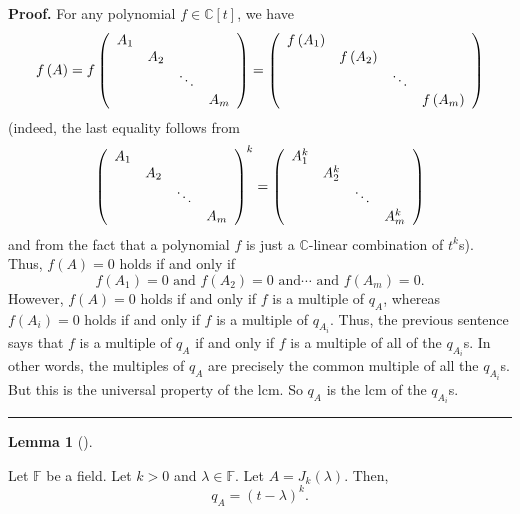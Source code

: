 \documentclass[numbers=enddot,12pt,final,onecolumn,notitlepage]{scrartcl}%
\numberwithin{exer}{subsection}
\theoremstyle{definition}
\newtheorem{lem}[theo]{Lemma}
\newenvironment{lemma}[1][]
{\begin{lem}[#1]\begin{leftbar}}
{\end{leftbar}\end{lem}}
\newenvironment{proof}[1][Proof]{\noindent\textbf{#1.} }{\ \rule{0.5em}{0.5em}}
\begin{document}
\begin{proof}
For any polynomial $f\in\mathbb{C}\left[  t\right]  $, we have%
\[
f\left(  A\right)  =f\left(
\begin{array}
[c]{cccc}%
A_{1} &  &  & \\
& A_{2} &  & \\
&  & \ddots & \\
&  &  & A_{m}%
\end{array}
\right)  =\left(
\begin{array}
[c]{cccc}%
f\left(  A_{1}\right)  &  &  & \\
& f\left(  A_{2}\right)  &  & \\
&  & \ddots & \\
&  &  & f\left(  A_{m}\right)
\end{array}
\right)
\]
(indeed, the last equality follows from%
\[
\left(
\begin{array}
[c]{cccc}%
A_{1} &  &  & \\
& A_{2} &  & \\
&  & \ddots & \\
&  &  & A_{m}%
\end{array}
\right)  ^{k}=\left(
\begin{array}
[c]{cccc}%
A_{1}^{k} &  &  & \\
& A_{2}^{k} &  & \\
&  & \ddots & \\
&  &  & A_{m}^{k}%
\end{array}
\right)
\]
and from the fact that a polynomial $f$ is just a $\mathbb{C}$-linear
combination of $t^{k}$s). Thus, $f\left(  A\right)  =0$ holds if and only if%
\[
f\left(  A_{1}\right)  =0\text{ and }f\left(  A_{2}\right)  =0\text{ and
}\cdots\text{ and }f\left(  A_{m}\right)  =0.
\]
However, $f\left(  A\right)  =0$ holds if and only if $f$ is a multiple of
$q_{A}$, whereas $f\left(  A_{i}\right)  =0$ holds if and only if $f$ is a
multiple of $q_{A_{i}}$. Thus, the previous sentence says that $f$ is a
multiple of $q_{A}$ if and only if $f$ is a multiple of all of the $q_{A_{i}}%
$s. In other words, the multiples of $q_{A}$ are precisely the common multiple
of all the $q_{A_{i}}$s. But this is the universal property of the lcm. So
$q_{A}$ is the lcm of the $q_{A_{i}}$s.
\end{proof}

\begin{lemma}
\label{lem.jnf.mipo.Jklam}Let $\mathbb{F}$ be a field. Let $k>0$ and
$\lambda\in\mathbb{F}$. Let $A=J_{k}\left(  \lambda\right)  $. Then,%
\[
q_{A}=\left(  t-\lambda\right)  ^{k}.
\]

\end{lemma}
\end{document}
